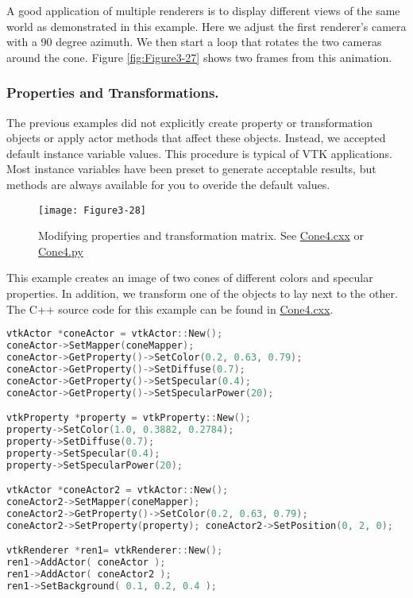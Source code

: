 A good application of multiple renderers is to display different views of the same world as demonstrated in this example. Here we adjust the first renderer's camera with a 90 degree azimuth. We then start a loop that rotates the two cameras around the cone. Figure \ref{fig:Figure3-27} shows two frames from this animation.

\subsubsection{Properties and Transformations.}

The previous examples did not explicitly create property or transformation objects or apply actor methods that affect these objects. Instead, we accepted default instance variable values. This procedure is typical of VTK applications. Most instance variables have been preset to generate acceptable results, but methods are always available for you to overide the default values. 

\begin{figure}[!htb]
  \centering
  \texttt{[image: Figure3-28]}\\
  \caption{Modifying properties and transformation matrix. See  \href{https://lorensen.github.io/VTKExamples/site/Cxx/Rendering/Cone4/}{Cone4.cxx} or \href{https://lorensen.github.io/VTKExamples/site/Python/Rendering/Cone4/}{Cone4.py}}\label{fig:Figure3-28}
\end{figure}

This example creates an image of two cones of different colors and specular properties. In addition, we transform one of the objects to lay next to the other. The C++ source code for this example can be found in \href{https://lorensen.github.io/VTKExamples/site/Cxx/Rendering/Cone4/}{Cone4.cxx}.

\begin{lstlisting}[language=C++, caption={Cone4.cxx}]
vtkActor *coneActor = vtkActor::New();
coneActor->SetMapper(coneMapper);
coneActor->GetProperty()->SetColor(0.2, 0.63, 0.79);
coneActor->GetProperty()->SetDiffuse(0.7);
coneActor->GetProperty()->SetSpecular(0.4);
coneActor->GetProperty()->SetSpecularPower(20);

vtkProperty *property = vtkProperty::New();
property->SetColor(1.0, 0.3882, 0.2784);
property->SetDiffuse(0.7);
property->SetSpecular(0.4);
property->SetSpecularPower(20);

vtkActor *coneActor2 = vtkActor::New();
coneActor2->SetMapper(coneMapper);
coneActor2->GetProperty()->SetColor(0.2, 0.63, 0.79);
coneActor2->SetProperty(property); coneActor2->SetPosition(0, 2, 0);

vtkRenderer *ren1= vtkRenderer::New();
ren1->AddActor( coneActor );
ren1->AddActor( coneActor2 );
ren1->SetBackground( 0.1, 0.2, 0.4 );
\end{lstlisting}

